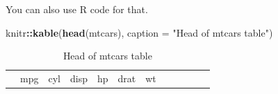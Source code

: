 \documentclass{article}
\newenvironment{Shaded}{\begin{snugshade}}{\end{snugshade}}
\newcommand{\AttributeTok}[1]{\textcolor[rgb]{0.13,0.29,0.53}{#1}}
\newcommand{\FunctionTok}[1]{\textcolor[rgb]{0.13,0.29,0.53}{\textbf{#1}}}
\newcommand{\NormalTok}[1]{#1}
\newcommand{\SpecialCharTok}[1]{\textcolor[rgb]{0.81,0.36,0.00}{\textbf{#1}}}
\newcommand{\StringTok}[1]{\textcolor[rgb]{0.31,0.60,0.02}{#1}}
\begin{document}
You can also use R code for that.

\begin{Shaded}
\begin{Highlighting}[]
\NormalTok{knitr}\SpecialCharTok{::}\FunctionTok{kable}\NormalTok{(}\FunctionTok{head}\NormalTok{(mtcars), }\AttributeTok{caption =} \StringTok{"Head of mtcars table"}\NormalTok{)}
\end{Highlighting}
\end{Shaded}

\begin{longtable}[]{@{}
  >{\raggedright\arraybackslash}p{}
  >{\raggedleft\arraybackslash}p{}
  >{\raggedleft\arraybackslash}p{}
  >{\raggedleft\arraybackslash}p{}
  >{\raggedleft\arraybackslash}p{}
  >{\raggedleft\arraybackslash}p{}
  >{\raggedleft\arraybackslash}p{}
  >{\raggedleft\arraybackslash}p{}
  >{\raggedleft\arraybackslash}p{}
  >{\raggedleft\arraybackslash}p{}
  >{\raggedleft\arraybackslash}p{}
  >{\raggedleft\arraybackslash}p{}@{}}
\caption{Head of mtcars table}\tabularnewline
\toprule\noalign{}
\begin{minipage}[b]{\linewidth}\raggedright
\end{minipage} & \begin{minipage}[b]{\linewidth}\raggedleft
mpg
\end{minipage} & \begin{minipage}[b]{\linewidth}\raggedleft
cyl
\end{minipage} & \begin{minipage}[b]{\linewidth}\raggedleft
disp
\end{minipage} & \begin{minipage}[b]{\linewidth}\raggedleft
hp
\end{minipage} & \begin{minipage}[b]{\linewidth}\raggedleft
drat
\end{minipage} & \begin{minipage}[b]{\linewidth}\raggedleft
wt
\end{minipage} & \begin{minipage}[b]{\linewidth}\raggedleft

\end{minipage}
\end{longtable}
\end{document}
